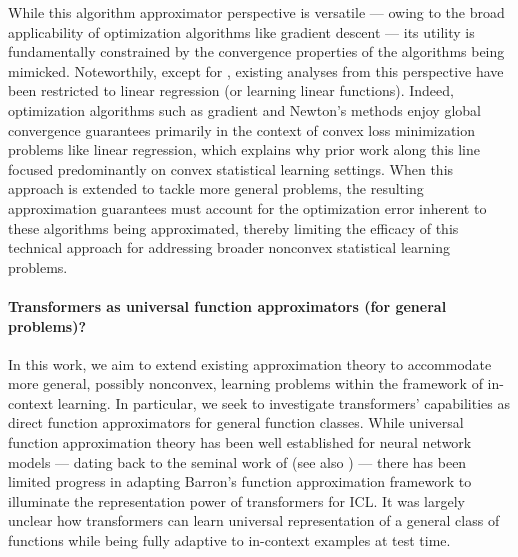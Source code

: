 \documentclass[english]{article}
\newcommand{\yxc}[1]{\textcolor{yxccolor}{[YXC: #1]}}
\begin{document}


While this algorithm approximator perspective is versatile --- owing to the broad applicability of optimization algorithms like gradient descent --- its utility is fundamentally constrained by the convergence properties of the algorithms being mimicked. Noteworthily, except for \citet{giannou2023looped,hataya2024automatic}, existing analyses from this perspective have been restricted to linear regression (or learning linear functions). Indeed, optimization algorithms such as gradient and Newton's methods enjoy global convergence guarantees primarily in the context of convex loss minimization problems like linear regression, which explains why prior work along this line focused predominantly on convex statistical learning settings. 
When this approach is extended to tackle more general problems, the resulting approximation guarantees must account for the optimization error inherent to these algorithms being approximated, thereby limiting the efficacy of this technical approach for addressing broader nonconvex statistical learning problems. 








\paragraph{Transformers as universal function approximators (for general problems)?} 

In this work, we aim to extend existing approximation theory to accommodate more general, possibly nonconvex, learning problems within the framework of in-context learning. In particular, we seek to investigate transformers' capabilities as direct function approximators for general function classes. 
While universal function approximation theory has been well established for neural network models --- dating back to the seminal work of \citet{Barron1993Universal} (see also \citet{hornik1994degree,bach2017breaking,juditsky2000functional,kurkova2002bounds,lee2017ability,ji2020neural,ma2022barron}) --- 
there has been limited progress in adapting Barron's function approximation framework to illuminate the representation power of transformers for ICL. It was largely unclear how transformers can learn universal representation of a general class of functions  while being fully adaptive to in-context examples at test time. 
\end{document}
